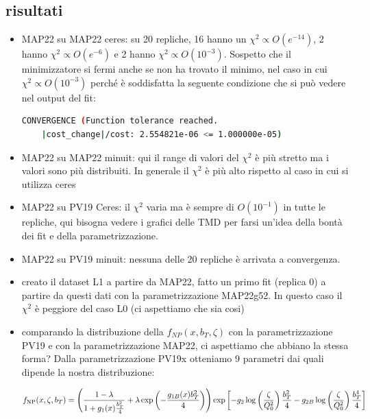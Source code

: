 \documentclass{article}
\begin{document}
\subsection{risultati}
\begin{itemize}
    \item MAP22 su MAP22 ceres: su 20 repliche, 16 hanno un $\chi^2 \propto O(e^{-14})$, 2 hanno $\chi^2 \propto O(e^{-6})$ e 2 hanno $\chi^2 \propto O(10^{-3})$.
    Sospetto che il minimizzatore si fermi anche se non ha trovato il minimo, nel caso in cui $\chi^2 \propto O(10^{-3})$ perché è soddisfatta la seguente condizione che si può vedere nel output del fit: 
    \begin{lstlisting}[language=bash]
    CONVERGENCE (Function tolerance reached.
    |cost_change|/cost: 2.554821e-06 <= 1.000000e-05)
    \end{lstlisting}

   \item MAP22 su MAP22 minuit: qui il range di valori del $\chi^2$ è più stretto ma i valori sono più distribuiti. In generale il $\chi^2$ è più alto rispetto al caso in cui si utilizza ceres

   \item MAP22 su PV19 Ceres: il $\chi^2$ varia ma è sempre di $O(10^{-1})$ in tutte le repliche, qui bisogna vedere i grafici delle TMD per farsi un'idea della bontà dei fit e della parametrizzazione.

   \item MAP22 su PV19 minuit: nessuna delle 20 repliche è arrivata a convergenza.

   \item creato il dataset L1 a partire da MAP22, fatto un primo fit (replica 0) a partire da questi dati con la parametrizzazione MAP22g52. In questo caso il $\chi^2$ è peggiore del caso L0 (ci aspettiamo che sia cosi)

   \item comparando la distribuzione della $f_{NP}(x, b_{T}, \zeta)$ con la parametrizzazione PV19 e con la parametrizzazione MAP22, ci aspettiamo che abbiano la stessa forma? 
   Dalla parametrizzazione PV19x otteniamo 9 parametri dai quali dipende la nostra distribuzione:

    \[ f_{\rm NP}(x, \zeta, b_T) = \left(\frac{1 - \lambda}{1 + g_1(x) \frac{b_T^2}{4}} + \lambda \exp\left(-\frac{g_{1B}(x) b_T^2}{4}\right)\right) \exp\left[-g_2 \log\left(\frac{\zeta}{Q_0^2}\right) \frac{b_T^2}{4} - g_{2B} \log\left(\frac{\zeta}{Q_0^2}\right) \frac{b_T^4}{4}\right] \]


\end{itemize}
\end{document}
